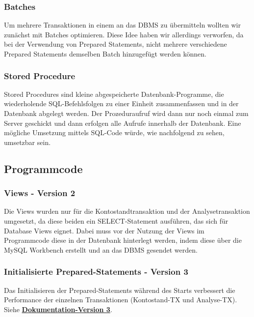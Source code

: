 \subsubsection{Batches}
Um mehrere Transaktionen in einem an das DBMS zu übermitteln wollten wir zunächst mit Batches optimieren.
Diese Idee haben wir allerdings verworfen, da bei der Verwendung von Prepared Statements, nicht mehrere verschiedene Prepared Statements demselben Batch hinzugefügt werden können.
\subsubsection{Stored Procedure}
Stored Procedures sind kleine abgespeicherte Datenbank-Programme, die wiederholende SQL-Befehlsfolgen zu einer Einheit zusammenfassen und in der Datenbank abgelegt werden.
Der Prozeduraufruf wird dann nur noch einmal zum Server geschickt und dann erfolgen alle Aufrufe innerhalb der Datenbank.
Eine mögliche Umsetzung mittels SQL-Code würde, wie nachfolgend zu sehen, umsetzbar sein.

\subsection{Programmcode}\label{subsec:programmcode}
\subsubsection{Views - Version 2}
Die Views wurden nur für die Kontostandtransaktion und der Analysetransaktion umgesetzt, da diese beiden ein SELECT-Statement ausführen, das sich für Database Views eignet.
Dabei muss vor der Nutzung der Views im Programmcode diese in der Datenbank hinterlegt werden, indem diese über die MySQL Workbench erstellt und an das DBMS gesendet werden.



\subsubsection{Initialisierte Prepared-Statements - Version 3}
Das Initialisieren der Prepared-Statements während des Starts verbessert die Performance der einzelnen Transaktionen (Kontostand-TX und Analyse-TX).
Siehe \hyperref[subsec:version3]{\textbf{Dokumentation-Version 3}}.

